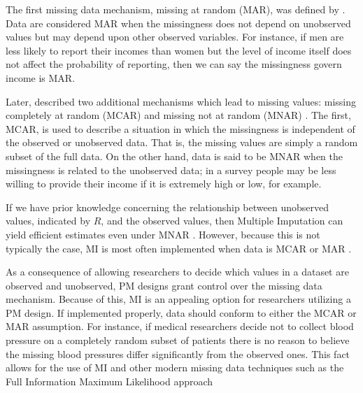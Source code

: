 \documentclass{svjour3}\usepackage[]{graphicx}\usepackage[]{color}
\begin{document}
The first missing data mechanism, missing at random (MAR), was defined by \citet{rubin1976inference}. Data are considered MAR when the missingness does not depend on unobserved values but may depend upon other observed variables. For instance, if men are less likely to report their incomes than women but the level of income itself does not affect the probability of reporting, then we can say the missingness govern income is MAR. \par

Later, \citet{little2014statistical} described two additional mechanisms which lead to missing values: missing completely at random (MCAR) and missing not at random (MNAR) \citep{little2014statistical}. The first, MCAR, is used to describe a situation in which the missingness is independent of the observed or unobserved data. That is, the missing values are simply a random subset of the full data. On the other hand, data is said to be MNAR when the missingness is related to the unobserved data; in a survey people may be less willing to provide their income if it is extremely high or low, for example. \par

If we have prior knowledge concerning the relationship between unobserved values, indicated by $R$, and the observed values, then Multiple Imputation can yield efficient estimates even under MNAR \citep{harel2007multiple}. However, because this is not typically the case, MI is most often implemented when data is MCAR or MAR \citep{little2014statistical}. \par

As a consequence of allowing researchers to decide which values in a dataset are observed and unobserved, PM designs grant control over the missing data mechanism. Because of this, MI is an appealing option for researchers utilizing a PM design. If implemented properly, data should conform to either the MCAR or MAR assumption. For instance, if medical researchers decide not to collect blood pressure on a completely random subset of patients there is no reason to believe the missing blood pressures differ significantly from the observed ones. This fact allows for the use of MI and other modern missing data techniques such as the Full Information Maximum Likelihood approach \citep{dempster1977maximum} \par
\end{document}
